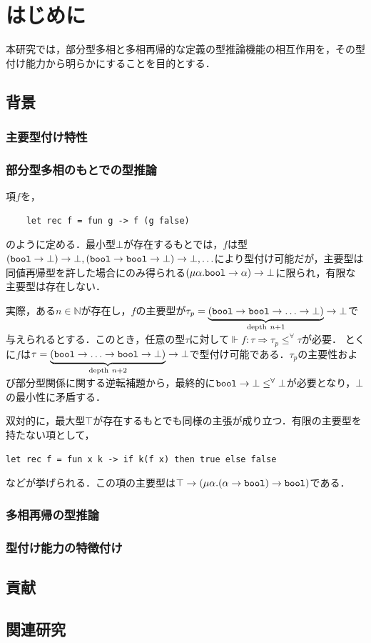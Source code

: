 \section{はじめに}
本研究では，部分型多相と多相再帰的な定義の型推論機能の相互作用を，その型付け能力から明らかにすることを目的とする．
\subsection{背景}
\subsubsection{主要型付け特性}

\subsubsection{部分型多相のもとでの型推論}

\begin{remark}
項$f$を，\begin{lstlisting}
    let rec f = fun g -> f (g false)
\end{lstlisting}
のように定める．最小型$\bot$が存在するもとでは，$f$は型$(\tt{bool} \to \bot) \to \bot, (\tt{bool} \to \tt{bool} \to \bot) \to \bot, \ldots$により型付け可能だが，主要型は同値再帰型を許した場合にのみ得られる$(\mu \alpha . \tt{bool} \to \alpha) \to \bot$に限られ，有限な主要型は存在しない．

実際，ある$n \in \mathbb{N}$が存在し，$f$の主要型が$\tau_p = \underbrace{(\tt{bool} \to \tt{bool} \to \ldots \to \bot)}_{\text{depth}\ n + 1} \to \bot$で与えられるとする．このとき，任意の型$\tau$に対して$\Vdash f : \tau \Rightarrow \tau_p \leq^{\forall} \tau$が必要．
とくに$f$は$\tau = \underbrace{(\tt{bool}\to\ldots\to \tt{bool}  \to \bot)}_{\text{depth}\ n+2} \to \bot$で型付け可能である．$\tau_p$の主要性および部分型関係に関する逆転補題から，最終的に$\tt{bool} \to \bot \leq^\forall \bot$が必要となり，$\bot$の最小性に矛盾する．
\end{remark}
双対的に，最大型$\top$が存在するもとでも同様の主張が成り立つ．有限の主要型を持たない項として，\begin{lstlisting}
let rec f = fun x k -> if k(f x) then true else false
\end{lstlisting}などが挙げられる．この項の主要型は$\top \to (\mu \alpha. (\alpha \to \tt{bool}) \to \tt{bool})$である．
\subsubsection{多相再帰の型推論}
\subsubsection{型付け能力の特徴付け}

\subsection{貢献}
\subsection{関連研究}